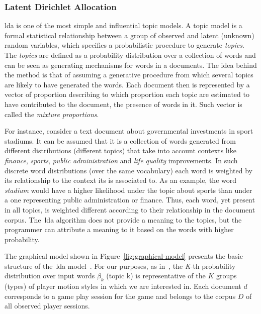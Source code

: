 \subsubsection{Latent Dirichlet Allocation}
\glsdesc{lda} is one of the most simple and influential topic models. A topic model is a formal statistical relationship between a group of observed and latent (unknown) random variables, which specifies a probabilistic procedure to generate \textit{topics}. The \textit{topics} are defined as a probability distribution over a collection of words and can be seen as generating mechanisms for words in a documents. The idea behind the method is that of assuming a generative procedure from which several topics are likely to have generated the words. Each document then is represented by a vector of proportion describing to which proportion each topic are estimated to have contributed to the document, \ie the presence of words in it. Such vector is called the \textit{mixture proportions}.



For instance, consider a text document about governmental investments in sport stadiums. It can be assumed that it is a collection of words generated from different distributions (different topics) that take into account contexts like \textit{finance}, \textit{sports}, \textit{public administration} and \textit{life quality} improvements. In such discrete word distributions (over the same vocabulary) each word is weighted by its relationship to the context its is associated to. As an example, the word \textit{stadium} would have a higher likelihood under the topic about sports than under a one representing public administration or finance. Thus, each word, yet present in all topics, is weighted different according to their relationship in the document corpus. The~\glsdesc{lda} algorithm does not provide a meaning to the topics, but the programmer can attribute a meaning to it based on the words with higher probability.

The graphical model shown in Figure~\ref{fig:graphical-model} presents the basic structure of the~\gls{lda} model~\citep{blei_latent_2003}. For our purposes, as in~\cite{smith_mining_2016}, the \textit{K}-th probability distribution over input words $\beta_{k}$ (topic k) is representative of the $K$ groups (types) of player motion styles in which we are interested in. Each document $d$ corresponds to a game play session for the game and belongs to the corpus $D$ of all observed player sessions.

